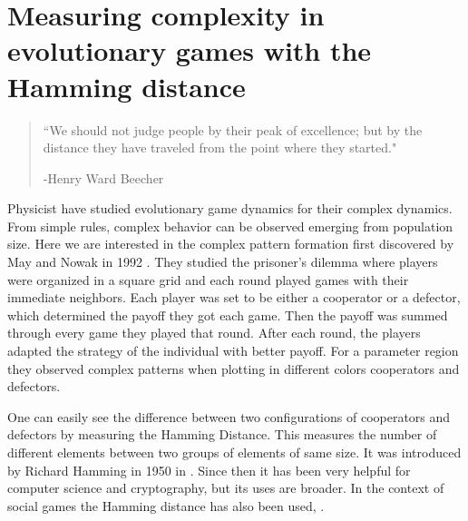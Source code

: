 \chapter{Measuring complexity in evolutionary games with the Hamming distance}
\label{chap:HammingGames}




\begin{quotation}

	\vspace{-3cm}
    \begin{flushright}
    \begin{minipage}[t][5cm][b]{0.5\textwidth}
    { ``We should not judge people by their peak of excellence; but by the distance they have traveled from the point where they started."}
    
    \bigskip
    
    -{\small  Henry Ward Beecher}
    \end{minipage}
    \end{flushright}
    
    \vspace{0.5cm}
\end{quotation}




Physicist have studied evolutionary game dynamics for their complex dynamics. From simple rules, complex behavior can be observed emerging from population size. Here we are interested in the complex pattern formation first discovered by May and Nowak in 1992 \cite{SpatialChaos}. They studied the prisoner's dilemma where players were organized in a square grid and each round played games with their immediate neighbors. Each player was set to be either a cooperator or a defector, which determined the payoff they got each game. Then the payoff was summed through every game they played that round. After each round, the players adapted the strategy of the individual with better payoff. For a parameter region they observed complex patterns when plotting in different colors cooperators and defectors.

One can easily see the difference between two configurations of cooperators and defectors by measuring the Hamming Distance. This measures the number of different elements between two groups of elements of same size. It was introduced
by Richard Hamming in 1950 in \cite{HammingOrigins}. Since then it has been very helpful for computer science and cryptography, but its uses are broader. In the context of social games the Hamming distance has also been used, \cite{HammingSocial1, HammingSocial2}.

